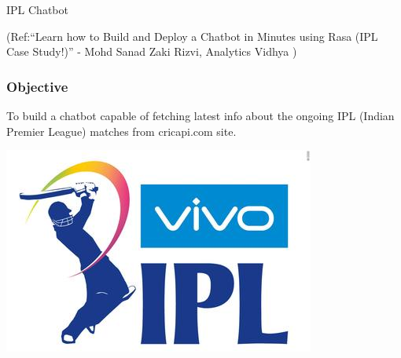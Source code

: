 \begin{frame}[fragile]\frametitle{}
\begin{center}
{\Large IPL Chatbot}

{\tiny (Ref:``Learn how to Build and Deploy a Chatbot in Minutes using Rasa (IPL Case Study!)'' - Mohd Sanad Zaki Rizvi, Analytics Vidhya )}
\end{center}
\end{frame}

 \begin{frame}[fragile]\frametitle{Objective}
To build a chatbot capable of fetching latest info about the ongoing IPL (Indian Premier League) matches from cricapi.com site.

\begin{center}
\includegraphics[width=0.6\linewidth,keepaspectratio]{images/ipl.jpg}
\end{center}

\end{frame}






